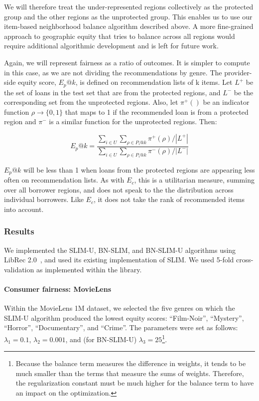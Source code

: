 We will therefore treat the under-represented regions collectively as the protected group and the other regions as the unprotected group. This enables us to use our item-based neighborhood balance algorithm described above. A more fine-grained approach to geographic equity that tries to balance across all regions would require additional algorithmic development and is left for future work. 

Again, we will represent fairness as a ratio of outcomes. It is simpler to compute in this case, as we are not dividing the recommendations by genre. The provider-side equity score, $E_p@k$, is defined on recommendation lists of k items. Let $L^+$ be the set of loans in the test set that are from the protected regions, and $L^-$ be the corresponding set from the unprotected regions. Also, let $\pi^+()$ be an indicator function $\rho \rightarrow \{0,1\}$ that maps to 1 if the recommended loan is from a protected region and $\pi^-$ is a similar function for the unprotected regions. Then:

\begin{equation}
E_p@k=\frac{\sum_{i \in U}{\sum_{\rho \in P_i@k}{\pi^+(\rho)}}/|L^+|}
{\sum_{i \in U}{\sum_{\rho \in P_i@k}{\pi^-(\rho)}}/|L^-|}
\end{equation}

$E_p@k$ will be less than 1 when loans from the protected regions are appearing less often on recommendation lists. As with $E_c$, this is a utilitarian measure, summing over all borrower regions, and does not speak to the the distribution across individual borrowers. Like $E_c$, it does not take the rank of recommended items into account.

\subsubsection{\textbf{Results}}
\hfill

We implemented the SLIM-U, BN-SLIM, and BN-SLIM-U algorithms using LibRec 2.0~\cite{guo2015librec}, and used its existing implementation of SLIM. We used 5-fold cross-validation as implemented within the library.

\paragraph{\textbf{Consumer fairness: MovieLens}}

Within the MovieLens 1M dataset, we selected the five genres on which the SLIM-U algorithm produced the lowest equity scores: ``Film-Noir'', ``Mystery'', ``Horror'', ``Documentary'', and ``Crime''. The parameters were set as follows: $\lambda_1 = 0.1$, $\lambda_2 = 0.001$, and (for BN-SLIM-U) $\lambda_3 = 25$\footnote{Because the balance term measures the difference in weights, it tends to be much smaller than the terms that measure the sums of weights. Therefore, the regularization constant must be much higher for the balance term to have an impact on the optimization.}. 

